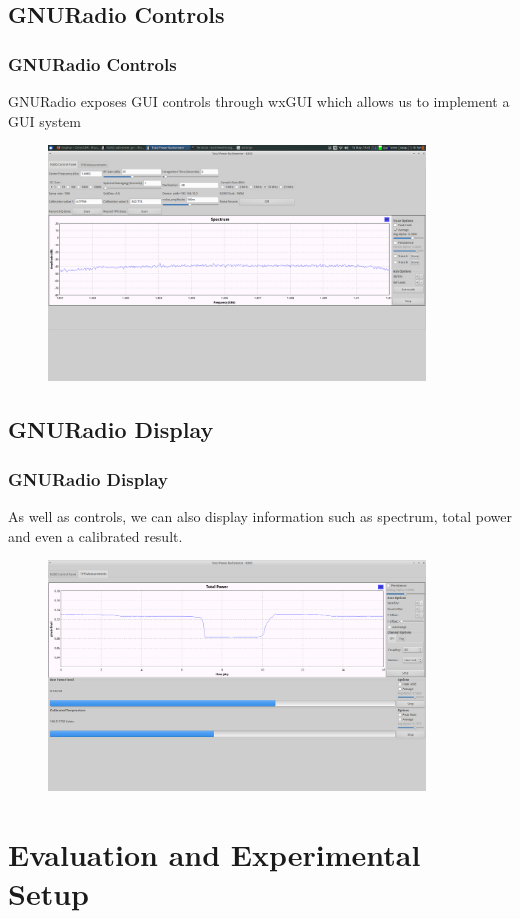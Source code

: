 \documentclass{beamer}
\begin{document}
\subsection{GNURadio Controls}
\begin{frame}
\frametitle{GNURadio Controls}
GNURadio exposes GUI controls through wxGUI which allows us to implement a GUI system
\begin{figure}\label{GNURadio_GUI}
\includegraphics[width=10cm]{images/radiometer_gui.png}
\end{figure}

\end{frame}

\subsection{GNURadio Display}
\begin{frame}
\frametitle{GNURadio Display}
As well as controls, we can also display information such as spectrum, total power and even a calibrated result.
\begin{figure}\label{GNURadio_GUI}
\includegraphics[width=10cm]{images/Lab1_TPR_at_end_exp.png}
\end{figure}
\end{frame}
\section{Evaluation and Experimental Setup}
\end{document}
